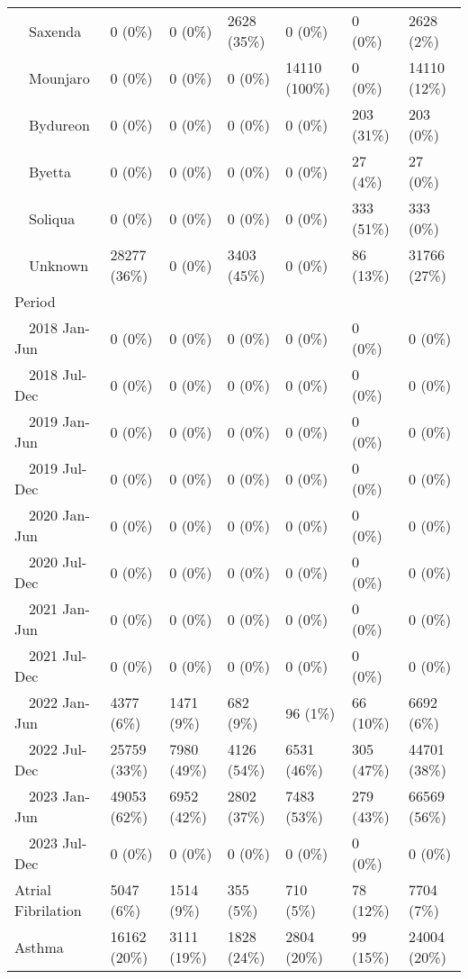 \begin{longtable}{p{}p{}p{}p{}p{}p{}p{}}
    Saxenda & 0 (0\%) & 0 (0\%) & 2628 (35\%) & 0 (0\%) & 0 (0\%) & 2628 (2\%) \\ 
    Mounjaro & 0 (0\%) & 0 (0\%) & 0 (0\%) & 14110 (100\%) & 0 (0\%) & 14110 (12\%) \\ 
    Bydureon & 0 (0\%) & 0 (0\%) & 0 (0\%) & 0 (0\%) & 203 (31\%) & 203 (0\%) \\ 
    Byetta & 0 (0\%) & 0 (0\%) & 0 (0\%) & 0 (0\%) & 27 (4\%) & 27 (0\%) \\ 
    Soliqua & 0 (0\%) & 0 (0\%) & 0 (0\%) & 0 (0\%) & 333 (51\%) & 333 (0\%) \\ 
    Unknown & 28277 (36\%) & 0 (0\%) & 3403 (45\%) & 0 (0\%) & 86 (13\%) & 31766 (27\%) \\ 
  Period &  &  &  &  &  &  \\ 
    2018 Jan-Jun & 0 (0\%) & 0 (0\%) & 0 (0\%) & 0 (0\%) & 0 (0\%) & 0 (0\%) \\ 
    2018 Jul-Dec & 0 (0\%) & 0 (0\%) & 0 (0\%) & 0 (0\%) & 0 (0\%) & 0 (0\%) \\ 
    2019 Jan-Jun & 0 (0\%) & 0 (0\%) & 0 (0\%) & 0 (0\%) & 0 (0\%) & 0 (0\%) \\ 
    2019 Jul-Dec & 0 (0\%) & 0 (0\%) & 0 (0\%) & 0 (0\%) & 0 (0\%) & 0 (0\%) \\ 
    2020 Jan-Jun & 0 (0\%) & 0 (0\%) & 0 (0\%) & 0 (0\%) & 0 (0\%) & 0 (0\%) \\ 
    2020 Jul-Dec & 0 (0\%) & 0 (0\%) & 0 (0\%) & 0 (0\%) & 0 (0\%) & 0 (0\%) \\ 
    2021 Jan-Jun & 0 (0\%) & 0 (0\%) & 0 (0\%) & 0 (0\%) & 0 (0\%) & 0 (0\%) \\ 
    2021 Jul-Dec & 0 (0\%) & 0 (0\%) & 0 (0\%) & 0 (0\%) & 0 (0\%) & 0 (0\%) \\ 
    2022 Jan-Jun & 4377 (6\%) & 1471 (9\%) & 682 (9\%) & 96 (1\%) & 66 (10\%) & 6692 (6\%) \\ 
    2022 Jul-Dec & 25759 (33\%) & 7980 (49\%) & 4126 (54\%) & 6531 (46\%) & 305 (47\%) & 44701 (38\%) \\ 
    2023 Jan-Jun & 49053 (62\%) & 6952 (42\%) & 2802 (37\%) & 7483 (53\%) & 279 (43\%) & 66569 (56\%) \\ 
    2023 Jul-Dec & 0 (0\%) & 0 (0\%) & 0 (0\%) & 0 (0\%) & 0 (0\%) & 0 (0\%) \\ 
  Atrial Fibrilation & 5047 (6\%) & 1514 (9\%) & 355 (5\%) & 710 (5\%) & 78 (12\%) & 7704 (7\%) \\ 
  Asthma & 16162 (20\%) & 3111 (19\%) & 1828 (24\%) & 2804 (20\%) & 99 (15\%) & 24004 (20\%) \\ 

\end{longtable}
